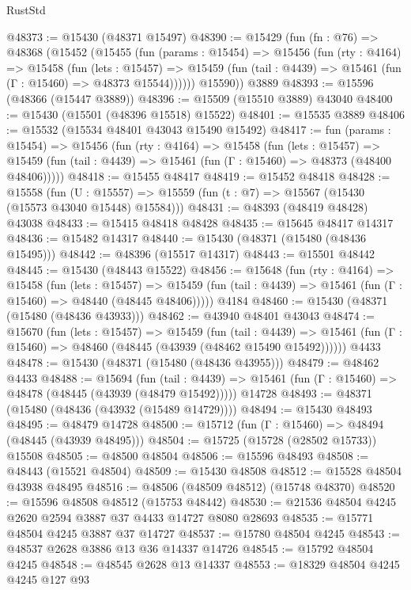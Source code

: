 \begin{lexlean}{RustStd}
\begin{coremodule}
@48373 := @15430 (@48371 @15497)
@48390 := @15429
    (fun (fn : @76) =>
    @48368
      (@15452
        (@15455
          (fun (params : @15454) =>
          @15456
            (fun (rty : @4164) =>
            @15458
              (fun (lets : @15457) =>
              @15459 (fun (tail : @4439) => @15461 (fun (Γ : @15460) => @48373 @15544))))))
        @15590))
    @3889
@48393 := @15596 (@48366 (@15447 @3889))
@48396 := @15509 (@15510 @3889) @43040
@48400 := @15430 (@15501 (@48396 @15518) @15522)
@48401 := @15535 @3889
@48406 := @15532 (@15534 @48401 @43043 @15490 @15492)
@48417 := fun (params : @15454) =>
  @15456
    (fun (rty : @4164) =>
    @15458
      (fun (lets : @15457) =>
      @15459 (fun (tail : @4439) => @15461 (fun (Γ : @15460) => @48373 (@48400 @48406)))))
@48418 := @15455 @48417
@48419 := @15452 @48418
@48428 := @15558
    (fun (U : @15557) => @15559 (fun (t : @7) => @15567 (@15430 (@15573 @43040 @15448) @15584)))
@48431 := @48393 (@48419 @48428) @43038
@48433 := @15415 @48418 @48428
@48435 := @15645 @48417 @14317
@48436 := @15482 @14317
@48440 := @15430 (@48371 (@15480 (@48436 @15495)))
@48442 := @48396 (@15517 @14317)
@48443 := @15501 @48442
@48445 := @15430 (@48443 @15522)
@48456 := @15648
    (fun (rty : @4164) =>
    @15458
      (fun (lets : @15457) =>
      @15459 (fun (tail : @4439) => @15461 (fun (Γ : @15460) => @48440 (@48445 @48406)))))
    @4184
@48460 := @15430 (@48371 (@15480 (@48436 @43933)))
@48462 := @43940 @48401 @43043
@48474 := @15670
    (fun (lets : @15457) =>
    @15459
      (fun (tail : @4439) =>
      @15461 (fun (Γ : @15460) => @48460 (@48445 (@43939 (@48462 @15490 @15492))))))
    @4433
@48478 := @15430 (@48371 (@15480 (@48436 @43955)))
@48479 := @48462 @4433
@48488 := @15694
    (fun (tail : @4439) => @15461 (fun (Γ : @15460) => @48478 (@48445 (@43939 (@48479 @15492)))))
    @14728
@48493 := @48371 (@15480 (@48436 (@43932 (@15489 @14729))))
@48494 := @15430 @48493
@48495 := @48479 @14728
@48500 := @15712 (fun (Γ : @15460) => @48494 (@48445 (@43939 @48495)))
@48504 := @15725 (@15728 (@28502 @15733)) @15508
@48505 := @48500 @48504
@48506 := @15596 @48493
@48508 := @48443 (@15521 @48504)
@48509 := @15430 @48508
@48512 := @15528 @48504 @43938 @48495
@48516 := @48506 (@48509 @48512) (@15748 @48370)
@48520 := @15596 @48508 @48512 (@15753 @48442)
@48530 := @21536 @48504 @4245 @2620 @2594 @3887 @37 @4433 @14727 @8080 @28693
@48535 := @15771 @48504 @4245 @3887 @37 @14727
@48537 := @15780 @48504 @4245
@48543 := @48537 @2628 @3886 @13 @36 @14337 @14726
@48545 := @15792 @48504 @4245
@48548 := @48545 @2628 @13 @14337
@48553 := @18329 @48504 @4245 @4245 @127 @93

\end{coremodule}
\end{lexlean}
